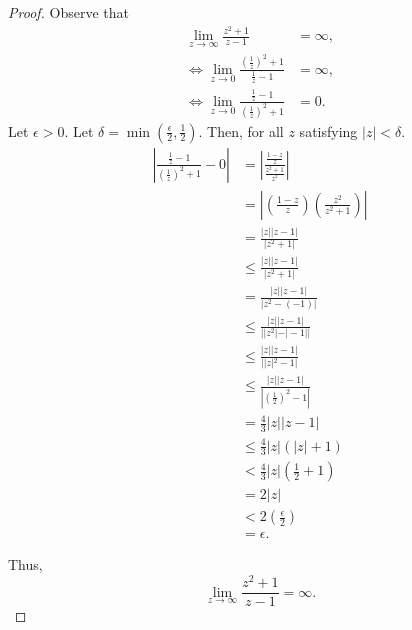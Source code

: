 \documentclass[11pt]{article}		%
\theoremstyle{definition}
\begin{document}
\newpage
{}
\begin{proof}
    Observe that
    \begin{align*}
        \lim_{z\to\infty} \frac{z^2+1}{z-1} &= \infty, \\
        \iff \lim_{z\to0} \frac{\left(\frac1z\right)^2+1}{\frac1z-1} &= \infty, \\
        \iff \lim_{z\to0} \frac{\frac1z-1}{\left(\frac1z\right)^2+1} &= 0.
    \end{align*}
    Let $\epsilon > 0$.
    Let $\delta = \min\left(\frac\epsilon2, \frac12\right)$.
    Then, for all $z$ satisfying $|z| < \delta$.
    \begin{align*}
        \left|\frac{\frac1z-1}{\left(\frac1z\right)^2+1}-0\right| &= \left|\frac{\frac{1-z}z}{\frac{z^2+1}{z^2}}\right| \\
        &= \left|\left(\frac{1-z}z\right)\left(\frac{z^2}{z^2+1}\right)\right| \\
        &= \frac{|z||z-1|}{|z^2+1|} \\
        &\leq \frac{|z||z-1|}{|z^2+1|} \\
        &= \frac{|z||z-1|}{|z^2 - (-1)|} \\
        &\leq \frac{|z||z-1|}{||z^2| - |-1||} \\
        &\leq \frac{|z||z-1|}{||z|^2 - 1|} \\
        &\leq \frac{|z||z-1|}{\left|\left(\frac12\right)^2 - 1\right|} \\
        &= \frac43|z||z-1| \\
        &\leq \frac43|z|(|z| + 1) \\
        &< \frac43|z|(\frac12 + 1) \\
        &= 2|z| \\
        &< 2\left(\frac\epsilon2\right) \\
        &= \epsilon.
    \end{align*}

    Thus, $$\lim_{z\to\infty} \frac{z^2+1}{z-1} = \infty.$$
\end{proof}
\end{document}
